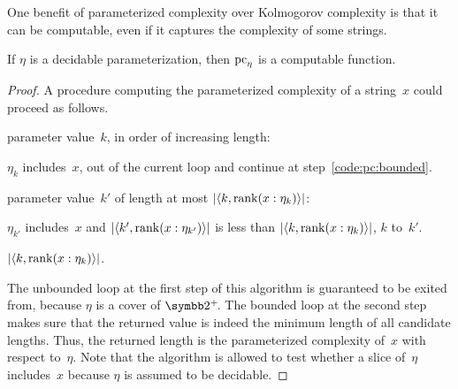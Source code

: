 One benefit of parameterized complexity over Kolmogorov complexity is that it can be computable, even if it captures the complexity of some strings.
\begin{lemma}
\label{lem:pccomputable}%
  If $\eta$ is a decidable parameterization, then $\operatorname{pc}_\eta$ is a computable function.
\end{lemma}
\begin{proof}
  A procedure computing the parameterized complexity of a string~$x$ could proceed as follows.
  \begin{codelisting}
  \item
     parameter value~$k$, in order of increasing length:
    \begin{codelisting}
    \item
       $\eta_k$ includes~$x$,
      \itemcont {} out of the current loop and continue at step~\ref{code:pc:bounded}.
    \end{codelisting}
  \item\label{code:pc:bounded}%
     parameter value~$k'$ of length at most ${\lvert{\langle k, \operatorname{rank}(x : \eta_k)\rangle}\rvert}$:
    \begin{codelisting}
    \item
       $\eta_{k'}$ includes~$x$ and $\length{\pair{k'}{\rank(x : \eta_{k'})}}$ is less than $\length{\pair{k}{\rank(x : \eta_k)}}$,
      \itemcont {} $k$ to~$k'$.
    \end{codelisting}
    \item
       ${\lvert{\langle k, \operatorname{rank}(x : \eta_k)\rangle}\rvert}$.
  \end{codelisting}
  The unbounded loop at the first step of this algorithm is guaranteed to be exited from, because $\eta$ is a cover of $\binary^+\!$.
  The bounded loop at the second step makes sure that the returned value is indeed the minimum length of all candidate lengths.
  Thus, the returned length is the parameterized complexity of~$x$ with respect to~$\eta$.
  Note that the algorithm is allowed to test whether a slice of~$\eta$ includes~$x$ because $\eta$ is assumed to be decidable.
\end{proof}

